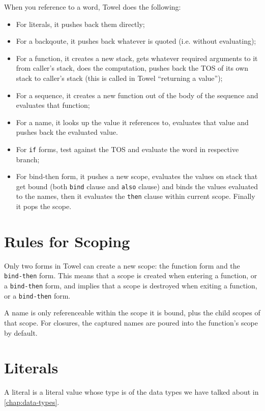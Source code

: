 \documentclass{report}
\begin{document}
When you reference to a word, Towel does the following:
\begin{itemize}
\item For literals, it pushes back them directly;
\item For a backqoute, it pushes back whatever is quoted (i.e. without evaluating);
\item For a function, it creates a new stack, gets whatever required arguments to it from caller's stack, does the computation, pushes back the TOS of its own stack to caller's stack (this is called in Towel ``returning a value'');
\item For a sequence, it creates a new function out of the body of the sequence and evaluates that function;
\item For a name, it looks up the value it references to, evaluates that value and pushes back the evaluated value.
\item For \texttt{if} forms, test against the TOS and evaluate the word in respective branch;
\item For bind-then form, it pushes a new scope, evaluates the values on stack that get bound (both \texttt{bind} clause and \texttt{also} clause) and binds the values evaluated to the names, then it evaluates the \texttt{then} clause within current scope. Finally it pops the scope.
\end{itemize}

\section{Rules for Scoping}\label{sec:scope-rule}

Only two forms in Towel can create a new scope: the function form and the \texttt{bind-then} form. This means that a scope is created when entering a function, or a \texttt{bind-then} form, and implies that a scope is destroyed when exiting a function, or a \texttt{bind-then} form.

A name is only referenceable within the scope it is bound, plus the child scopes of that scope. For closures, the captured names are poured into the function's scope by default.

\section{Literals}\label{sec:w-literal}

A literal is a literal value whose type is of the data types we have talked about in \autoref{chap:data-types}.
\end{document}
